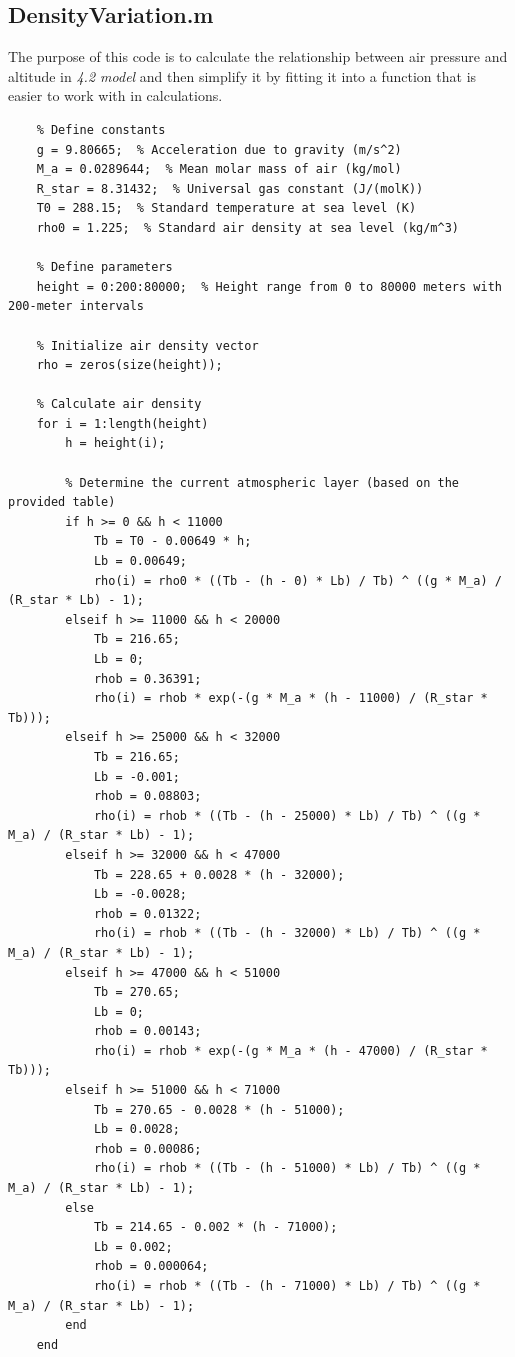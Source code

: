 \documentclass[12pt]{article}
\begin{document}
\subsection{DensityVariation.m}
The purpose of this code is to calculate the relationship between air 
pressure and altitude in \textit{4.2 model} and then simplify 
it by fitting it into a function that is easier to work with in calculations.
\begin{lstlisting}
    % Define constants
    g = 9.80665;  % Acceleration due to gravity (m/s^2)
    M_a = 0.0289644;  % Mean molar mass of air (kg/mol)
    R_star = 8.31432;  % Universal gas constant (J/(molK))
    T0 = 288.15;  % Standard temperature at sea level (K)
    rho0 = 1.225;  % Standard air density at sea level (kg/m^3)

    % Define parameters
    height = 0:200:80000;  % Height range from 0 to 80000 meters with 200-meter intervals

    % Initialize air density vector
    rho = zeros(size(height));

    % Calculate air density
    for i = 1:length(height)
        h = height(i);
        
        % Determine the current atmospheric layer (based on the provided table)
        if h >= 0 && h < 11000
            Tb = T0 - 0.00649 * h;
            Lb = 0.00649;
            rho(i) = rho0 * ((Tb - (h - 0) * Lb) / Tb) ^ ((g * M_a) / (R_star * Lb) - 1);
        elseif h >= 11000 && h < 20000
            Tb = 216.65;
            Lb = 0;
            rhob = 0.36391;
            rho(i) = rhob * exp(-(g * M_a * (h - 11000) / (R_star * Tb)));
        elseif h >= 25000 && h < 32000
            Tb = 216.65;
            Lb = -0.001;
            rhob = 0.08803;
            rho(i) = rhob * ((Tb - (h - 25000) * Lb) / Tb) ^ ((g * M_a) / (R_star * Lb) - 1);
        elseif h >= 32000 && h < 47000
            Tb = 228.65 + 0.0028 * (h - 32000);
            Lb = -0.0028;
            rhob = 0.01322;
            rho(i) = rhob * ((Tb - (h - 32000) * Lb) / Tb) ^ ((g * M_a) / (R_star * Lb) - 1);
        elseif h >= 47000 && h < 51000
            Tb = 270.65;
            Lb = 0;
            rhob = 0.00143;
            rho(i) = rhob * exp(-(g * M_a * (h - 47000) / (R_star * Tb)));
        elseif h >= 51000 && h < 71000
            Tb = 270.65 - 0.0028 * (h - 51000);
            Lb = 0.0028;
            rhob = 0.00086;
            rho(i) = rhob * ((Tb - (h - 51000) * Lb) / Tb) ^ ((g * M_a) / (R_star * Lb) - 1);
        else
            Tb = 214.65 - 0.002 * (h - 71000);
            Lb = 0.002;
            rhob = 0.000064;
            rho(i) = rhob * ((Tb - (h - 71000) * Lb) / Tb) ^ ((g * M_a) / (R_star * Lb) - 1);
        end
    end


\end{lstlisting}
\end{document}
